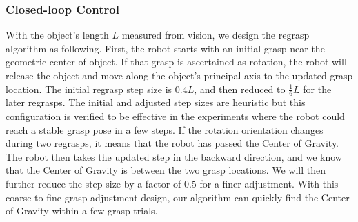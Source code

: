 \subsubsection{Closed-loop Control} \label{closedloopcontrol}


With the object's length $L$ measured from vision, we design the regrasp algorithm as following. First, the robot starts with an initial grasp near the geometric center of object. If that grasp is ascertained as rotation, the robot will release the object and move along the object's principal axis to the updated grasp location. The initial regrasp step size is $0.4L$, and then reduced to $\frac{1}{6}L$ for the later regrasps. The initial and adjusted step sizes are heuristic but this configuration is 
verified to be effective in the experiments where the robot could reach a stable grasp pose in a few steps. If the rotation orientation changes during two regrasps, it means that the robot has passed the Center of Gravity. The robot then takes the updated step in the backward direction, and we know that the Center of Gravity is between the two grasp locations. We will then further reduce the step size by a factor of 0.5 for a finer adjustment. 
With this coarse-to-fine grasp adjustment design, our algorithm can quickly find the Center of Gravity within a few grasp trials.



